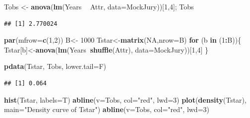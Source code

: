 \documentclass[]{book}
\newenvironment{Shaded}{\begin{snugshade}}{\end{snugshade}}
\newcommand{\KeywordTok}[1]{\textcolor[rgb]{0.13,0.29,0.53}{\textbf{#1}}}
\newcommand{\DataTypeTok}[1]{\textcolor[rgb]{0.13,0.29,0.53}{#1}}
\newcommand{\DecValTok}[1]{\textcolor[rgb]{0.00,0.00,0.81}{#1}}
\newcommand{\StringTok}[1]{\textcolor[rgb]{0.31,0.60,0.02}{#1}}
\newcommand{\OtherTok}[1]{\textcolor[rgb]{0.56,0.35,0.01}{#1}}
\newcommand{\ControlFlowTok}[1]{\textcolor[rgb]{0.13,0.29,0.53}{\textbf{#1}}}
\newcommand{\OperatorTok}[1]{\textcolor[rgb]{0.81,0.36,0.00}{\textbf{#1}}}
\newcommand{\NormalTok}[1]{#1}
\theoremstyle{definition}
\theoremstyle{definition}
\theoremstyle{remark}
\begin{document}
\begin{Shaded}
\begin{Highlighting}[]
\NormalTok{Tobs <-}\StringTok{ }\KeywordTok{anova}\NormalTok{(}\KeywordTok{lm}\NormalTok{(Years }\OperatorTok{~}\StringTok{ }\NormalTok{Attr, }\DataTypeTok{data=}\NormalTok{MockJury))[}\DecValTok{1}\NormalTok{,}\DecValTok{4}\NormalTok{]; Tobs}
\end{Highlighting}
\end{Shaded}

\begin{verbatim}
## [1] 2.770024
\end{verbatim}

\begin{Shaded}
\begin{Highlighting}[]
\KeywordTok{par}\NormalTok{(}\DataTypeTok{mfrow=}\KeywordTok{c}\NormalTok{(}\DecValTok{1}\NormalTok{,}\DecValTok{2}\NormalTok{))}
\NormalTok{B<-}\StringTok{ }\DecValTok{1000}
\NormalTok{Tstar<-}\KeywordTok{matrix}\NormalTok{(}\OtherTok{NA}\NormalTok{,}\DataTypeTok{nrow=}\NormalTok{B)}
\ControlFlowTok{for}\NormalTok{ (b }\ControlFlowTok{in}\NormalTok{ (}\DecValTok{1}\OperatorTok{:}\NormalTok{B))\{}
\NormalTok{  Tstar[b]<-}\KeywordTok{anova}\NormalTok{(}\KeywordTok{lm}\NormalTok{(Years}\OperatorTok{~}\KeywordTok{shuffle}\NormalTok{(Attr), }\DataTypeTok{data=}\NormalTok{MockJury))[}\DecValTok{1}\NormalTok{,}\DecValTok{4}\NormalTok{]}
\NormalTok{\}}

\KeywordTok{pdata}\NormalTok{(Tstar, Tobs, }\DataTypeTok{lower.tail=}\NormalTok{F)}
\end{Highlighting}
\end{Shaded}

\begin{verbatim}
## [1] 0.064
\end{verbatim}

\begin{Shaded}
\begin{Highlighting}[]
\KeywordTok{hist}\NormalTok{(Tstar, }\DataTypeTok{labels=}\NormalTok{T)}
\KeywordTok{abline}\NormalTok{(}\DataTypeTok{v=}\NormalTok{Tobs, }\DataTypeTok{col=}\StringTok{"red"}\NormalTok{, }\DataTypeTok{lwd=}\DecValTok{3}\NormalTok{)}
\KeywordTok{plot}\NormalTok{(}\KeywordTok{density}\NormalTok{(Tstar), }\DataTypeTok{main=}\StringTok{"Density curve of Tstar"}\NormalTok{)}
\KeywordTok{abline}\NormalTok{(}\DataTypeTok{v=}\NormalTok{Tobs, }\DataTypeTok{col=}\StringTok{"red"}\NormalTok{, }\DataTypeTok{lwd=}\DecValTok{3}\NormalTok{)}
\end{Highlighting}
\end{Shaded}
\end{document}
